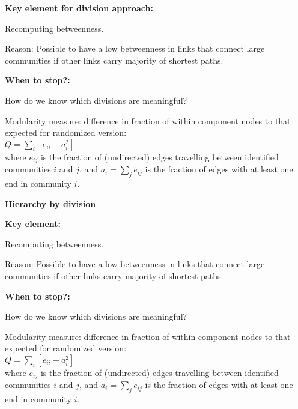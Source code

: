 




  \textbf{Key element for division approach:}
    
     
      Recomputing betweenness.
     
      \alert{Reason:} Possible to have a low betweenness
      in links that connect large communities
      if other links carry majority of shortest paths.
    
  

  \textbf{When to stop?:}
    
     
      How do we know which
      divisions are meaningful?
     
      \alert{Modularity measure:}
      difference in fraction of within component
      nodes to that expected for randomized version:\\
      \smallskip
      {
      $
      Q = 
      \sum_{i}
      [e_{ii} - a_{i}^2]
      $\\
      \smallskip
      where $e_{ij}$ is the fraction of (undirected) edges
      travelling between identified communities $i$ and $j$,
      and $a_i = \sum_{j}e_{ij}$ is the fraction of edges with
      at least one end in community $i$.
    }
    
  


  \textbf{Hierarchy by division}

  \textbf{Key element:}
    
     
      Recomputing betweenness.
     
      \alert{Reason:} Possible to have a low betweenness
      in links that connect large communities
      if other links carry majority of shortest paths.
    
  

  \textbf{When to stop?:}
    
     
      How do we know which
      divisions are meaningful?
     
      \alert{Modularity measure:}
      difference in fraction of within component
      nodes to that expected for randomized version:\\
      \smallskip
      {
      $
      Q = 
      \sum_{i}
      [e_{ii} - a_{i}^2]
      $\\
      \smallskip
      where $e_{ij}$ is the fraction of (undirected) edges
      travelling between identified communities $i$ and $j$,
      and $a_i = \sum_{j}e_{ij}$ is the fraction of edges with
      at least one end in community $i$.
    }
    
